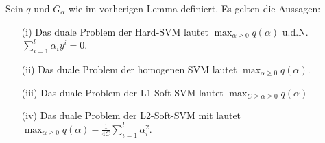 \begin{satz}
	\label{satz-svm-dual-probleme}
	Sein $q$ und $G_\alpha$ wie im vorherigen Lemma definiert. Es gelten die Aussagen:
\begin{itemize}
	\item[(i)] Das duale Problem der Hard-SVM lautet $\max_{\alpha \geq 0} q(\alpha)$ u.d.N. $\sum_{i=1}^l \alpha_i y^i = 0$.
	\item[(ii)] Das duale Problem der homogenen SVM lautet $\max_{\alpha \geq 0} q(\alpha)$.
	\item[(iii)] Das duale Problem der L1-Soft-SVM lautet $\max_{C \geq \alpha \geq 0} q(\alpha)$
	\item[(iv)] Das duale Problem der L2-Soft-SVM mit lautet $\max_{\alpha \geq 0} q(\alpha)-\frac{1}{4C}\sum_{i=1}^{l} \alpha_i^2$.
\end{itemize}
\end{satz}

